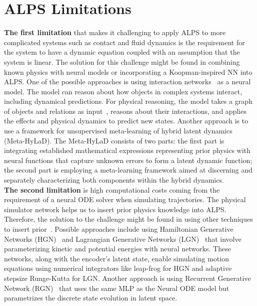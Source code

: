 \documentclass[acmtog]{techreportacmart}
\begin{document}
\section{ALPS Limitations}
\textbf{The first limitation} that makes it challenging to apply ALPS to more complicated systems such as contact and fluid dynamics is the requirement for the system to have a dynamic equation coupled with an assumption that the system is linear. The solution for this challenge might be found in combining known physics with neural models or incorporating a Koopman-inspired NN into ALPS. One of the possible approaches is using interaction networks~\cite{battaglia2016interaction} as a neural model. The model can reason about how objects in complex systems interact, including dynamical predictions. For physical reasoning, the model takes a graph of objects and relations as input~\cite{scarselli2009graph}, reasons about their interactions, and applies the effects and physical dynamics to predict new states. Another approach is to use a framework for unsupervised meta-learning of hybrid latent dynamics~\cite{ye2024unsupervised} (Meta-HyLaD). The Meta-HyLaD consists of two parts: the first part is integrating established mathematical expressions representing prior physics with neural functions that capture unknown errors to form a latent dynamic function; the second part is employing a meta-learning framework aimed at discerning and separately characterizing both components within the hybrid dynamics.
\\
\textbf{The second limitation} is high computational costs coming from the requirement of a neural ODE solver when simulating trajectories. The physical simulator network helps us to insert prior physics knowledge into ALPS. Therefore, the solution to the challenge might be found in using other techniques to insert prior~\cite{botev2021which}. Possible approaches include using Hamiltonian Generative Networks (HGN)~\cite{toth2019hamiltonian} and Lagrangian Generative Networks (LGN)~\cite{lutter2019deep} that involve parameterizing kinetic and potential energies with neural networks. These networks, along with the encoder's latent state, enable simulating motion equations using numerical integrators like leap-frog for HGN and adaptive stepsize Runge-Kutta for LGN. Another approach is using Recurrent Generative Network (RGN)~\cite{chen2019symplectic} that uses the same MLP as the Neural ODE model but parametrizes the discrete state evolution in latent space.
\end{document}
